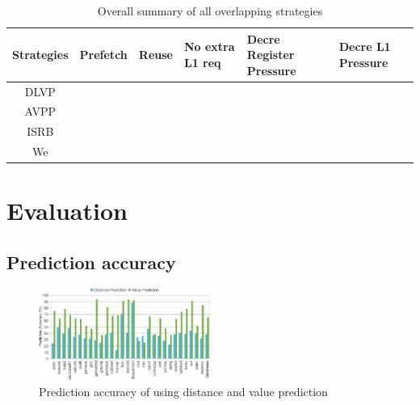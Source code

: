 \documentclass{sig-alternate}
\newcommand{\cmark}{\textcolor{ForestGreen}{\ding{51}}}%
\newcommand{\xmark}{\textcolor{red}{\ding{55}}}%
\begin{document}
\begin{scriptsize}
\begin{table}[h!]
  \centering
  \begin{tabular}{|c|l|l|p{10mm}|p{10mm}|p{10mm}|}
    \hline
    \textbf{Strategies} & 
    \textbf{Prefetch} & 
    \textbf{Reuse} & 
    \textbf{No extra} \newline  \textbf{L1 req} & 
    \textbf{Decre Register} \newline \textbf{Pressure} & 
    \textbf{Decre L1} \newline \textbf{Pressure}\\
    \hline
    
    \hline
    DLVP &  \cmark & \xmark &  \xmark & \xmark & \xmark \\
    \hline
    AVPP &  \cmark & \cmark &  \xmark & \cmark & \xmark \\
    \hline
    ISRB &  \xmark & \cmark &  \cmark & \cmark & \xmark \\
    \hline
    We &  \cmark & \cmark &  \cmark & \cmark & \cmark \\
    \hline

    
    \hline
  \end{tabular}
  \caption{Overall summary of all overlapping strategies}
  \label{table:formatting}
\end{table}
\end{scriptsize}





















\section{Evaluation}
\label{sec:Results}

\subsection{Prediction accuracy}

\begin{figure}[ht]
\centerline{\includegraphics[width=0.50\textwidth]{graphs/DistVsValue.pdf}}
\caption{Prediction accuracy of using distance and value prediction}
\label{fig:DistVsValue}
\end{figure}
\end{document}
